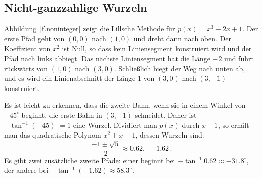 \subsection{Nicht-ganzzahlige Wurzeln}\label{s.noninteger}

Abbildung~\ref{f.noninteger} zeigt die Lillsche Methode für $p(x)=x^3-2x+1$. Der erste Pfad geht von $(0,0)$ nach $(1,0)$ und dreht dann nach oben. Der Koeffizient von $x^2$ ist Null, so dass kein Liniensegment konstruiert wird und der Pfad nach links abbiegt. Das nächste Liniensegment hat die Länge $-2$ und führt rückwärts von $(1,0)$ nach $(3,0)$. Schließlich biegt der Weg nach unten ab, und es wird ein Linienabschnitt der Länge $1$ von $(3,0)$ nach $(3,-1)$ konstruiert.

Es ist leicht zu erkennen, dass die zweite Bahn, wenn sie in einem Winkel von $-45^\circ$ beginnt, die erste Bahn in $(3,-1)$ schneidet. Daher ist $-\tan^{-1} (-45)^\circ=1$ eine Wurzel. Dividiert man $p(x)$ durch $x-1$, so erhält man das quadratische Polynom $x^2+x-1$, dessen Wurzeln sind:
\[
\frac{-1\pm\sqrt{5}}{2} \approx 0.62,\; -1.62\,.
\]
Es gibt zwei zusätzliche zweite Pfade: einer beginnt bei $-\tan^{-1} 0.62\approx -31.8^\circ$, der andere bei $-\tan^{-1}(-1.62)\approx 58.3^\circ$.


